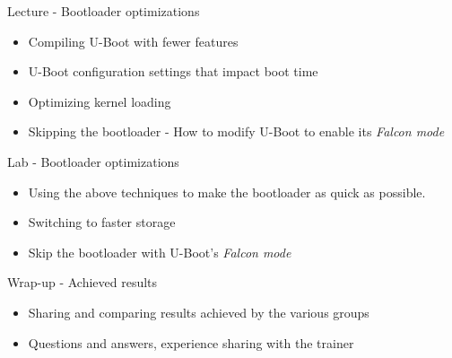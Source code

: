 \documentclass[a4paper,12pt,obeyspaces,spaces,hyphens]{article}
\begin{document}
\feagendatwocolumn
{Lecture - Bootloader optimizations}
{
  \begin{itemize}
  \item Compiling U-Boot with fewer features
  \item U-Boot configuration settings that impact boot time
  \item Optimizing kernel loading
  \item Skipping the bootloader - How to modify U-Boot to
        enable its {\em Falcon mode}
  \end{itemize}
}
{Lab - Bootloader optimizations}
{
 \begin{itemize}
 \item Using the above techniques to make the bootloader
    as quick as possible.
 \item Switching to faster storage
 \item Skip the bootloader with U-Boot's {\em Falcon mode}
 \end{itemize}
}

\feagendaonecolumn
{Wrap-up - Achieved results}
{
 \begin{itemize}
 \item Sharing and comparing results achieved by the various groups
 \item Questions and answers, experience sharing with the trainer
 \end{itemize}
}
\end{document}
